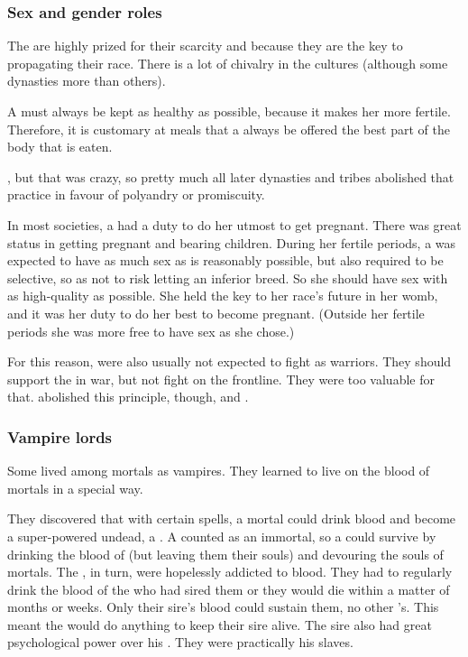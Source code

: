 \subsubsection{Sex and gender roles}
The \resviel{} are highly prized for their scarcity and because they are the key to propagating their race. 
There is a lot of chivalry in the \resphan{} cultures (although some dynasties more than others). 

A \resvil{} must always be kept as healthy as possible, because it makes her more fertile. 
Therefore, it is customary at meals that a \resvil{} always be offered the best part of the body that is eaten. 

\Merkyrah{} , but that was crazy, so pretty much all later \resphan{} dynasties and tribes abolished that practice in favour of polyandry or promiscuity.

In most \resphan{} societies, a \resvil{} had a duty to do her utmost to get pregnant. 
There was great status in getting pregnant and bearing children. 
During her fertile periods, a \resvil{} was expected to have as much sex as is reasonably possible, but also required to be selective, so as not to risk letting an inferior \resphan{} breed. 
So she should have sex with as high-quality \resphain{} as possible. 
She held the key to her race's future in her womb, and it was her duty to do her best to become pregnant. 
(Outside her fertile periods she was more free to have sex as she chose.)

For this reason, \resviel{} were also usually not expected to fight as warriors. 
They should support the \resphain{} in war, but not fight on the frontline. 
They were too valuable for that. 
\Mystraacht{} abolished this principle, though, and . 





\subsubsection{Vampire lords}
Some \ashenblood \resphain lived among mortals as vampires. 
They learned to live on the blood of mortals in a special way. 

They discovered that with certain spells, a mortal could drink \resphan blood and become a super-powered undead, a \quo{\reaver}. 
A \reaver {} counted as an immortal, so a \bezed \resphan could survive by drinking the blood of \reavers (but leaving them their souls) and devouring the souls of mortals. 
The \reavers, in turn, were hopelessly addicted to \resphan blood. 
They had to regularly drink the blood of the \resphan who had sired them or they would die within a matter of months or weeks. 
Only their sire's blood could sustain them, no other \resphan's. 
This meant the \reavers would do anything to keep their sire alive. 
The sire also had great psychological power over his \reavers. 
They were practically his slaves. 

